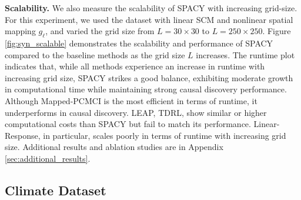 
% 
% 
% 




\textbf{Scalability.} We also measure the scalability of SPACY with increasing grid-size. For this experiment, we used the dataset with linear SCM and nonlinear spatial mapping $g_\ell$, and varied the grid size from $L=30\times 30$ to $L=250\times 250$. Figure \ref{fig:syn_scalable} demonstrates the scalability and performance of SPACY compared to the baseline methods as the grid size $L$ increases. The runtime plot indicates that, while all methods experience an increase in runtime with increasing grid size, SPACY strikes a good balance, exhibiting moderate growth in computational time while maintaining strong causal discovery performance. Although Mapped-PCMCI is the most efficient in terms of runtime, it underperforms in causal discovery. LEAP, TDRL,  show similar or higher computational costs than SPACY but fail to match its performance. Linear-Response, in particular, scales poorly in terms of runtime with increasing grid size. Additional results and ablation studies are in Appendix \ref{sec:additional_results}.




\subsection{Climate Dataset}



